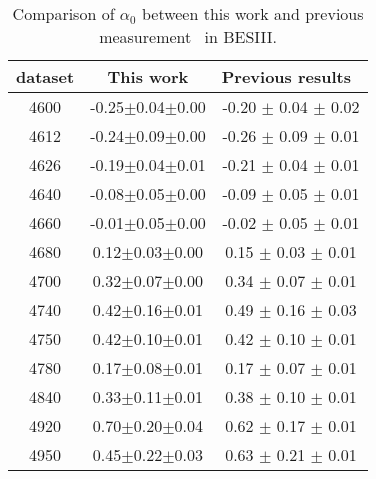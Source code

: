 \begin{table}[H]
    \centering
    \caption{Comparison of $\alpha_0$ between this work and previous measurement~\cite{BESIII:2017kqg,BESIII:2023rwv} in BESIII.}
    \label{tab:alpha0-comparison}
    \begin{tabular}{ccc}
    \hline\hline
dataset & This work & Previous results~\cite{BESIII:2017kqg,BESIII:2023rwv} \\\hline
4600 & -0.25$\pm$0.04$\pm$0.00 & -0.20 $\pm$ 0.04 $\pm$ 0.02\\
4612 & -0.24$\pm$0.09$\pm$0.00 & -0.26 $\pm$ 0.09 $\pm$ 0.01\\
4626 & -0.19$\pm$0.04$\pm$0.01 & -0.21 $\pm$ 0.04 $\pm$ 0.01\\
4640 & -0.08$\pm$0.05$\pm$0.00 & -0.09 $\pm$ 0.05 $\pm$ 0.01\\
4660 & -0.01$\pm$0.05$\pm$0.00 & -0.02 $\pm$ 0.05 $\pm$ 0.01\\
4680 & 0.12$\pm$0.03$\pm$0.00  & 0.15 $\pm$ 0.03 $\pm$ 0.01\\
4700 & 0.32$\pm$0.07$\pm$0.00  & 0.34 $\pm$ 0.07 $\pm$ 0.01\\
4740 & 0.42$\pm$0.16$\pm$0.01  & 0.49 $\pm$ 0.16 $\pm$ 0.03\\
4750 & 0.42$\pm$0.10$\pm$0.01 & 0.42 $\pm$ 0.10 $\pm$ 0.01\\
4780 & 0.17$\pm$0.08$\pm$0.01 & 0.17 $\pm$ 0.07 $\pm$ 0.01\\
4840 & 0.33$\pm$0.11$\pm$0.01 & 0.38 $\pm$ 0.10 $\pm$ 0.01\\
4920 & 0.70$\pm$0.20$\pm$0.04 & 0.62 $\pm$ 0.17 $\pm$ 0.01\\
4950 & 0.45$\pm$0.22$\pm$0.03 &  0.63 $\pm$ 0.21 $\pm$ 0.01\\
\hline\hline
    \end{tabular}
\end{table}

